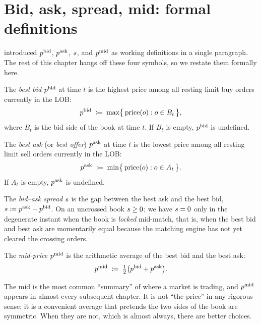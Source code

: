 \section{Bid, ask, spread, mid: formal definitions}
\label{sec:bidaskmid_formal}

 introduced $p^{\mathrm{bid}}$, $p^{\mathrm{ask}}$, $s$, and $p^{\mathrm{mid}}$ as
working definitions in a single paragraph. The rest of this chapter
hangs off these four symbols, so we restate them formally here.

\begin{definition}
The \emph{best bid} $p^{\mathrm{bid}}$ at time $t$ is the highest price among
all resting limit buy orders currently in the LOB:
\[
  p^{\mathrm{bid}} \;\coloneqq\; \max \bigl\{\, \mathrm{price}(o) : o \in B_t \,\bigr\},
\]
where $B_t$ is the bid side of the book at time $t$. If $B_t$ is
empty, $p^{\mathrm{bid}}$ is undefined.
\end{definition}

\begin{definition}
The \emph{best ask} (or \emph{best offer}) $p^{\mathrm{ask}}$ at time $t$ is the
lowest price among all resting limit sell orders currently in the
LOB:
\[
  p^{\mathrm{ask}} \;\coloneqq\; \min \bigl\{\, \mathrm{price}(o) : o \in A_t \,\bigr\}.
\]
If $A_t$ is empty, $p^{\mathrm{ask}}$ is undefined.
\end{definition}

\begin{definition}[Spread]
The \emph{bid--ask spread} $s$ is the gap between the best ask
and the best bid, $s \coloneqq p^{\mathrm{ask}} - p^{\mathrm{bid}}$. On an uncrossed
book $s \geq 0$; we have $s = 0$ only in the degenerate
instant when the book is \emph{locked} mid-match, that is, when the
best bid and best ask are momentarily equal because the matching
engine has not yet cleared the crossing orders.
\end{definition}

\begin{definition}
The \emph{mid-price} $p^{\mathrm{mid}}$ is the arithmetic average of the best
bid and the best ask:
\[
  p^{\mathrm{mid}} \;\coloneqq\; \tfrac{1}{2}\bigl(p^{\mathrm{bid}} + p^{\mathrm{ask}}\bigr).
\]
\end{definition}

The mid is the most common ``summary'' of where a market is trading,
and $p^{\mathrm{mid}}$ appears in almost every subsequent chapter. It is not
``the price'' in any rigorous sense; it is a convenient average that
pretends the two sides of the book are symmetric. When they are not,
which is almost always, there are better choices.

